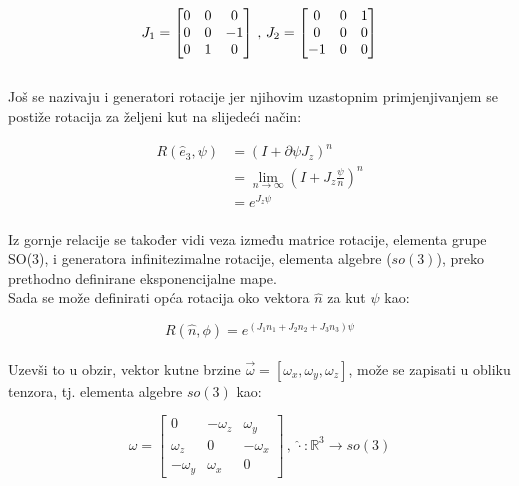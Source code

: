 \documentclass[times, utf8, diplomski]{fer}
\begin{document}
	\begin{equation}
		J_1 = 
		\begin{bmatrix}
		0	&	0	&	0 \\
		0	&	0	&	-1 \\
		0	&	1 	&	0
		\end{bmatrix} \\
		\, , \, J_2 = 
		\begin{bmatrix}
		0	&	0	&	1 \\
		0	&	0	&	0 \\
		-1	&	0 	&	0
		\end{bmatrix} 
	\end{equation}
	\\
	Još se nazivaju i generatori rotacije jer njihovim uzastopnim primjenjivanjem se postiže rotacija za željeni kut na slijedeći način:
	
	\begin{align}
		R( \hat{e}_3, \psi ) & = (I + \partial \psi J_z)^n \\
							 & = \lim_{n \rightarrow \infty} \left (I + J_z \frac{\psi}{n} \right )^n \\
							 & = e^{J_z \psi}
	\end{align}
	\\
	Iz gornje relacije se također vidi veza između matrice rotacije, elementa grupe SO(3), i generatora infinitezimalne rotacije, elementa algebre ($so(3)$), preko prethodno definirane eksponencijalne mape. \\
	Sada se može definirati opća rotacija oko vektora $\hat{n}$ za kut $\psi$ kao:
	
	\begin{equation}
		R( \hat{n}, \phi ) = e^{(J_1 n_1 + J_2 n_2 + J_3 n_3)\psi}
	\end{equation}
	\\
	Uzevši to u obzir, vektor kutne brzine $\vec{\omega} = [\omega_x, \omega_y, \omega_z]$, može se zapisati u obliku tenzora, tj. elementa algebre $so(3)$ kao: 
	
	\begin{equation}
		\hat{\omega} = 
		\begin{bmatrix}
			0			&	-\omega_z	& 	\omega_y \\
			\omega_z	&	0			& 	-\omega_x \\
			-\omega_y	&	\omega_x	&	0
		\end{bmatrix} \, , \, \hat{\cdot}: \mathbb{R}^3 \rightarrow so(3)
	\end{equation}
	
\end{document}
